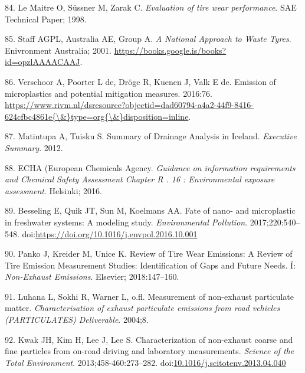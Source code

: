 \documentclass[icelandic,]{book}
\begin{document}
\leavevmode\hypertarget{ref-le1998evaluation}{}%
84. Le Maitre O, Süssner M, Zarak C. \emph{Evaluation of tire wear performance}. SAE Technical Paper; 1998.

\leavevmode\hypertarget{ref-atech2001national}{}%
85. Staff AGPL, Australia AE, Group A. \emph{A National Approach to Waste Tyres}. Enivronment Australia; 2001. \url{https://books.google.is/books?id=opzlAAAACAAJ}.

\leavevmode\hypertarget{ref-Verschoor2016}{}%
86. Verschoor A, Poorter L de, Dröge R, Kuenen J, Valk E de. Emission of microplastics and potential mitigation measures. 2016:76. \href{https://www.rivm.nl/dsresource?objectid=dad60794-a4a2-44f9-8416-624cfbc4861e\%7B/\&\%7Dtype=org\%7B/\&\%7Ddisposition=inline}{https://www.rivm.nl/dsresource?objectid=dad60794-a4a2-44f9-8416-624cfbc4861e\{\textbackslash{}\&\}type=org\{\textbackslash{}\&\}disposition=inline}.

\leavevmode\hypertarget{ref-Matinupa2012Summary}{}%
87. Matintupa A, Tuisku S. Summary of Drainage Analysis in Iceland. \emph{Executive Summary}. 2012.

\leavevmode\hypertarget{ref-ECHA2016}{}%
88. ECHA (European Chemicals Agency. \emph{Guidance on information requirements and Chemical Safety Assessment Chapter R . 16 : Environmental exposure assessment}. Helsinki; 2016.

\leavevmode\hypertarget{ref-BESSELING2017540}{}%
89. Besseling E, Quik JT, Sun M, Koelmans AA. Fate of nano- and microplastic in freshwater systems: A modeling study. \emph{Environmental Pollution}. 2017;220:540--548. doi:\href{https://doi.org/https://doi.org/10.1016/j.envpol.2016.10.001}{https://doi.org/10.1016/j.envpol.2016.10.001}

\leavevmode\hypertarget{ref-panko2018review}{}%
90. Panko J, Kreider M, Unice K. Review of Tire Wear Emissions: A Review of Tire Emission Measurement Studies: Identification of Gaps and Future Needs. Í: \emph{Non-Exhaust Emissions}. Elsevier; 2018:147--160.

\leavevmode\hypertarget{ref-luhana2004measurement}{}%
91. Luhana L, Sokhi R, Warner L, o.fl. Measurement of non-exhaust particulate matter. \emph{Characterisation of exhaust particulate emissions from road vehicles (PARTICULATES) Deliverable}. 2004;8.

\leavevmode\hypertarget{ref-Kwak2013}{}%
92. Kwak JH, Kim H, Lee J, Lee S. Characterization of non-exhaust coarse and fine particles from on-road driving and laboratory measurements. \emph{Science of the Total Environment}. 2013;458-460:273--282. doi:\href{https://doi.org/10.1016/j.scitotenv.2013.04.040}{10.1016/j.scitotenv.2013.04.040}
\end{document}
